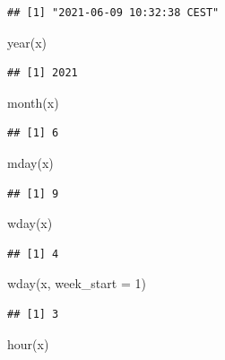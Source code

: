 \documentclass[
]{book}
\newenvironment{Shaded}{\begin{snugshade}}{\end{snugshade}}
\newcommand{\AttributeTok}[1]{\textcolor[rgb]{0.77,0.63,0.00}{#1}}
\newcommand{\DecValTok}[1]{\textcolor[rgb]{0.00,0.00,0.81}{#1}}
\newcommand{\FunctionTok}[1]{\textcolor[rgb]{0.00,0.00,0.00}{#1}}
\newcommand{\NormalTok}[1]{#1}
\begin{document}
\begin{verbatim}
## [1] "2021-06-09 10:32:38 CEST"
\end{verbatim}

\begin{Shaded}
\begin{Highlighting}[]
\FunctionTok{year}\NormalTok{(x)}
\end{Highlighting}
\end{Shaded}

\begin{verbatim}
## [1] 2021
\end{verbatim}

\begin{Shaded}
\begin{Highlighting}[]
\FunctionTok{month}\NormalTok{(x)}
\end{Highlighting}
\end{Shaded}

\begin{verbatim}
## [1] 6
\end{verbatim}

\begin{Shaded}
\begin{Highlighting}[]
\FunctionTok{mday}\NormalTok{(x)}
\end{Highlighting}
\end{Shaded}

\begin{verbatim}
## [1] 9
\end{verbatim}

\begin{Shaded}
\begin{Highlighting}[]
\FunctionTok{wday}\NormalTok{(x)}
\end{Highlighting}
\end{Shaded}

\begin{verbatim}
## [1] 4
\end{verbatim}

\begin{Shaded}
\begin{Highlighting}[]
\FunctionTok{wday}\NormalTok{(x, }\AttributeTok{week\_start =} \DecValTok{1}\NormalTok{)}
\end{Highlighting}
\end{Shaded}

\begin{verbatim}
## [1] 3
\end{verbatim}

\begin{Shaded}
\begin{Highlighting}[]
\FunctionTok{hour}\NormalTok{(x)}
\end{Highlighting}
\end{Shaded}
\end{document}
